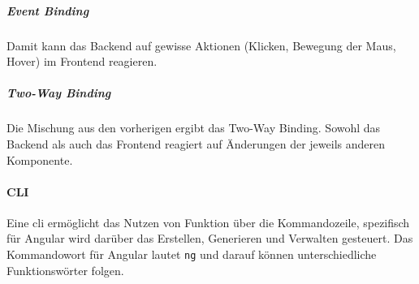 \subparagraph*{Event Binding} Damit kann das Backend auf gewisse Aktionen (Klicken, Bewegung der Maus, Hover) im Frontend reagieren.

\subparagraph*{Two-Way Binding} Die Mischung aus  den vorherigen ergibt das Two-Way Binding. Sowohl das Backend als auch das Frontend reagiert auf Änderungen der jeweils anderen Komponente.

\paragraph*{CLI}

Eine \gls{cli} ermöglicht das Nutzen von Funktion über die Kommandozeile, spezifisch für Angular wird darüber das Erstellen, Generieren und Verwalten gesteuert. Das Kommandowort für Angular lautet \lstinline{ng} und darauf können unterschiedliche Funktionswörter folgen.